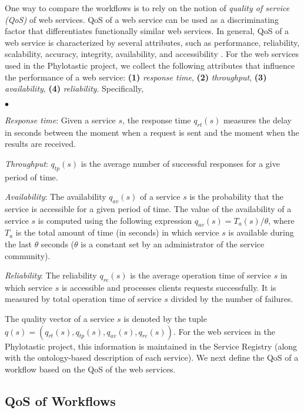\documentclass{new_tlp}
\begin{document}
One way to compare the workflows  is to rely on the notion of  \emph{quality of service (QoS)} of web services.
QoS of a web service can be used as a discriminating factor that differentiates  
functionally similar web services. In general, QoS of a web service is characterized by several attributes, such as performance, reliability, scalability, accuracy, integrity, availability, and accessibility \cite{RajendranB09}. For 
the web services used in the Phylotastic project, we  collect the following attributes that influence the performance of a web service: {\bf (1)} \emph{response time}, {\bf (2)} \emph{throughput},
{\bf (3)} \emph{availability}, {\bf (4)} \emph{reliability}. Specifically, 
\begin{list}{$\bullet$}{\itemsep=0pt \parsep=1pt \topsep=1pt \leftmargin=10pt}
    \item {\em Response time}: Given a service $s$, the response time $q_{rt}(s)$ measures the  delay in 
    seconds between the moment when a request is sent and the moment when the results are received.
    \item {\em Throughput}: $q_{tp}(s)$ is the average number of successful responses for a give period of time.
    \item {\em Availability}: The availability $q_{av}(s)$ of a service $s$ is the probability that the service is accessible for a given period of time. 
    The value of the availability of a service $s$ is computed using the following expression $q_{av}(s) = T_a(s) / 
    \theta$, where $T_a$ is the total amount of time (in seconds) in which service $s$ is available during the 
    last $\theta$ seconds ($\theta$ is a constant set by an administrator of the service community).
        
    \item {\em Reliability}: The reliability $q_{re}(s)$ is the average operation time of service $s$ in which service $s$ is accessible and processes clients     requests successfully. It is measured by total operation time of  service $s$ divided by the number of failures. 
\end{list}
The quality vector of a service $s$ is denoted by the tuple  
$q(s) = (q_{rt}(s), q_{tp}(s), q_{av}(s), q_{re}(s))$. For the web services in the Phylotastic project, this information 
is maintained in the Service Registry (along with the ontology-based description of each service). 
We next define the QoS of a workflow based on the QoS of the web services. 

\subsection{QoS of Workflows}
\label{qos_composite}
\end{document}
